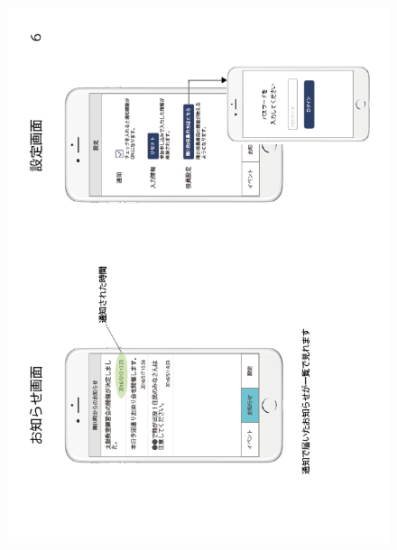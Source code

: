 \begin{figure}[ht]
    \begin{center}
    \includegraphics[keepaspectratio, scale=0.7]{appendixs/appendixB_figres/fig6.png}
    \end{center}
\end{figure}

